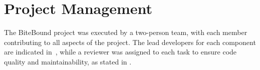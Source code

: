 \section{Project Management}
\label{sec:project_management}

The BiteBound project was executed by a two-person team, with each member contributing to all aspects of the project.
The lead developers for each component are indicated in~, while a reviewer was assigned to each task to ensure code quality and maintainability, as stated in .





